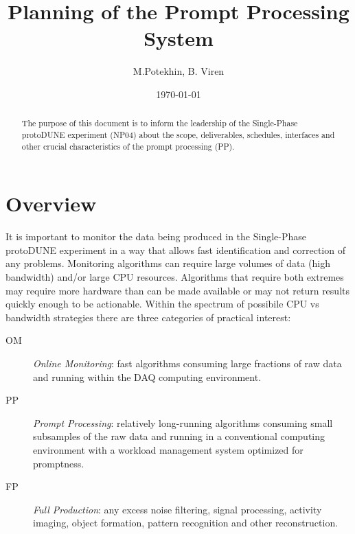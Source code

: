 \documentclass[pdftex,12pt,letter]{article}
\title{Planning of the \pd Prompt Processing System}
\date{\today}
\author{M.Potekhin, B. Viren}
\newcommand{\pd}{protoDUNE\xspace}
\begin{document}

\maketitle

\begin{abstract}
  \noindent The purpose of this document is to inform the leadership
  of the Single-Phase \pd experiment (NP04) about the scope,
  deliverables, schedules, interfaces and other crucial
  characteristics of the prompt processing (PP).
\end{abstract}

\tableofcontents

\pagebreak

\section{Overview}
It is important to monitor the data being produced in the Single-Phase
\pd experiment in a way that allows fast identification and correction
of any problems.  Monitoring algorithms can require large volumes of
data (high bandwidth) and/or large CPU resources.  Algorithms that require both extremes
may require more hardware than can be made available or may not return results quickly
enough to be actionable.
Within the spectrum of possibile CPU vs bandwidth strategies there are three categories
of practical interest:

\begin{description}

\item[OM] \textit{Online Monitoring}: fast algorithms consuming large fractions of raw data and running
within the DAQ computing environment.

\item[PP] \textit{Prompt Processing}: relatively long-running algorithms consuming small subsamples of the raw data and running in a conventional computing environment with a workload management system optimized for promptness.

\item[FP] \textit{Full Production}: any excess noise filtering, signal processing, activity imaging, object formation, pattern recognition and other reconstruction.

\end{description}
\end{document}
